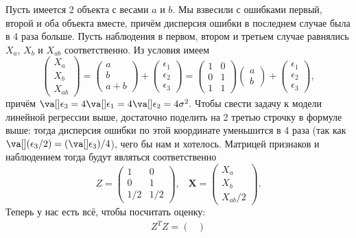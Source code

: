 \begin{example}
Пусть имеется 2 объекта с весами $a$ и $b$. Мы взвесили с ошибками первый, второй и оба объекта вместе, причём дисперсия ошибки в последнем случае была в 4 раза больше. Пусть наблюдения в первом, втором и третьем случае равнялись $X_a$, $X_b$ и $X_{ab}$ соответственно. Из условия имеем
\[
\begin{pmatrix}
X_a\\
X_b\\
X_{ab}
\end{pmatrix}
=
\begin{pmatrix}
a\\
b\\
a+b
\end{pmatrix}
+
\begin{pmatrix}
\epsilon_1\\
\epsilon_2\\
\epsilon_3
\end{pmatrix} = 
\begin{pmatrix}
1 & 0\\
0 & 1\\
1 & 1
\end{pmatrix}
\begin{pmatrix}
a\\
b
\end{pmatrix}
+
\begin{pmatrix}
\epsilon_1\\
\epsilon_2\\
\epsilon_3
\end{pmatrix}
,
\]
причём $\va[] \epsilon_3 = 4\va[] \epsilon_1 = 4\va[] \epsilon_2 = 4\sigma^2$. Чтобы свести задачу к модели линейной регрессии выше, достаточно поделить на 2 третью строчку в формуле выше: тогда дисперсия ошибки по этой координате уменьшится в 4 раза (так как $\va[] (\epsilon_3 / 2) = (\va[] \epsilon_3) / 4$), чего бы нам и хотелось. Матрицей признаков и наблюдением тогда будут являться соответственно
\[
Z = \begin{pmatrix}
1 & 0\\
0 & 1\\
1/2 & 1/2
\end{pmatrix},\;\;\; \mathbf X = \begin{pmatrix}
X_a\\
X_b\\
X_{ab} / 2
\end{pmatrix}.
\]
Теперь у нас есть всё, чтобы посчитать оценку:
\begin{gather*}
    Z^T Z = \begin{pmatrix}

\end{pmatrix}
\end{gather*}
\end{example}
